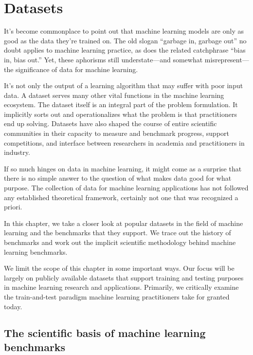 \documentclass{tufte-book}
\begin{document}
\chapter{Datasets}

It's become commonplace to point out that machine learning models are
only as good as the data they're trained on. The old slogan ``garbage
in, garbage out'' no doubt applies to machine learning practice, as does
the related catchphrase ``bias in, bias out.'' Yet, these aphorisms
still understate---and somewhat misrepresent---the significance of data
for machine learning.

It's not only the output of a learning algorithm that may suffer with
poor input data. A dataset serves many other vital functions in the
machine learning ecosystem. The dataset itself is an integral part of
the problem formulation. It implicitly sorts out and operationalizes
what the problem is that practitioners end up solving. Datasets have
also shaped the course of entire scientific communities in their
capacity to measure and benchmark progress, support competitions, and
interface between researchers in academia and practitioners in industry.

If so much hinges on data in machine learning, it might come as a
surprise that there is no simple answer to the question of what makes
data good for what purpose. The collection of data for machine learning
applications has not followed any established theoretical framework,
certainly not one that was recognized a priori.

In this chapter, we take a closer look at popular datasets in the field
of machine learning and the benchmarks that they support. We trace out
the history of benchmarks and work out the implicit scientific
methodology behind machine learning benchmarks.

We limit the scope of this chapter in some important ways. Our focus
will be largely on publicly available datasets that support training and
testing purposes in machine learning research and applications.
Primarily, we critically examine the train-and-test paradigm machine
learning practitioners take for granted today.

\hypertarget{the-scientific-basis-of-machine-learning-benchmarks}{%
\section{The scientific basis of machine learning
benchmarks}\label{the-scientific-basis-of-machine-learning-benchmarks}}
\end{document}
